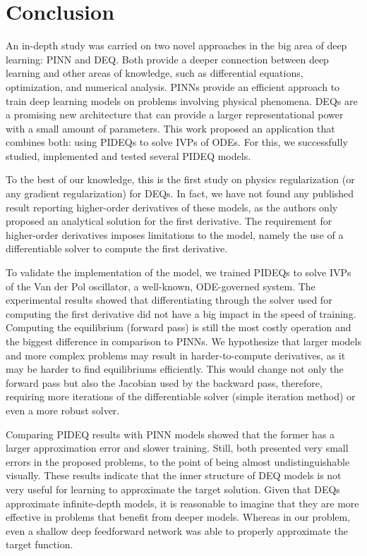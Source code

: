 \chapter{Conclusion}\label{ch:conclusion}

An in-depth study was carried on two novel approaches in the big area of deep learning: \gls{PINN} and {DEQ}.
Both provide a deeper connection between deep learning and other areas of knowledge, such as differential equations, optimization, and numerical analysis.
\gls{PINN}s provide an efficient approach to train deep learning models on problems involving physical phenomena.
\gls{DEQ}s are a promising new architecture that can provide a larger representational power with a small amount of parameters.
This work proposed an application that combines both: using \gls{PIDEQ}s to solve \gls{IVP}s of \gls{ODE}s.
For this, we successfully studied, implemented and tested several \gls{PIDEQ} models.

To the best of our knowledge, this is the first study on physics regularization (or any gradient regularization) for \gls{DEQ}s.
In fact, we have not found any published result reporting higher-order derivatives of these models, as the authors only proposed an analytical solution for the first derivative.
The requirement for higher-order derivatives imposes limitations to the model, namely the use of a differentiable solver to compute the first derivative.

To validate the implementation of the model, we trained \gls{PIDEQ}s to solve \gls{IVP}s of the Van der Pol oscillator, a well-known, \gls{ODE}-governed system.
The experimental results showed that differentiating through the solver used for computing the first derivative did not have a big impact in the speed of training.
Computing the equilibrium (forward pass) is still the most costly operation and the biggest difference in comparison to \gls{PINN}s.
We hypothesize that larger models and more complex problems may result in harder-to-compute derivatives, as it may be harder to find equilibriums efficiently.
This would change not only the forward pass but also the Jacobian used by the backward pass, therefore, requiring more iterations of the differentiable solver (simple iteration method) or even a more robust solver.

Comparing \gls{PIDEQ} results with \gls{PINN} models showed that the former has a larger approximation error and slower training.
Still, both presented very small errors in the proposed problems, to the point of being almost undistinguishable visually.
These results indicate that the inner structure of \gls{DEQ} models is not very useful for learning to approximate the target solution.
Given that \gls{DEQ}s approximate infinite-depth models, it is reasonable to imagine that they are more effective in problems that benefit from deeper models.
Whereas in our problem, even a shallow deep feedforward network was able to properly approximate the target function.

